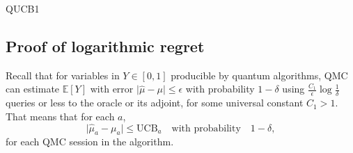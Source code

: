 
\begin{algorithm}
    \SetAlgoLined
    \caption{QUCB1}
    \label{alg:qucb1}
\end{algorithm}

\subsection{Proof of logarithmic regret}
Recall that for variables in $Y \in [0, 1]$ producible by quantum algorithms, QMC can estimate $\mathbb{E}[Y]$ with error $\lvert\hat{\mu} - \mu\rvert \leq \epsilon$ with probability $1-\delta$ using $\frac{C_1}{\epsilon} \log \frac{1}{\delta}$ queries or less to the oracle or its adjoint, for some universal constant $C_1>1$.
That means that for each $a$,
\begin{equation}
    \lvert\hat{\mu}_a - \mu_a\rvert \leq \text{UCB}_a
    \quad \text{with probability} \quad
    1 - \delta,
    \label{eq:wan_qmc}
\end{equation}
for each QMC session in the algorithm.

